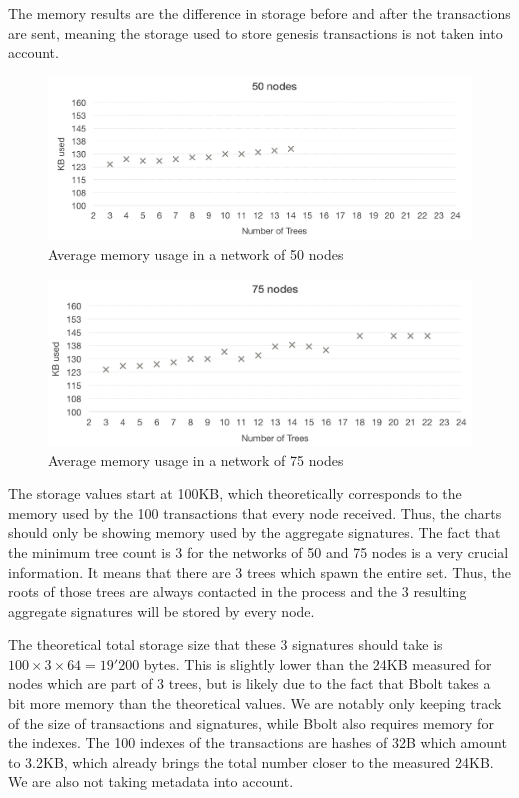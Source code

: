 \documentclass[11pt, a4paper, twoside, openright]{article}
\begin{document}
The memory results are the difference in storage before and after the transactions are sent, meaning the storage used to store genesis transactions is not taken into account.


\begin{figure}[htbp]
 \centering
  \includegraphics[width=\textwidth]{50graph.png}
  \caption{Average memory usage in a network of 50 nodes}
\end{figure}

\begin{figure}[htbp]
 \centering
  \includegraphics[width=\textwidth]{75graph.png}
  \caption{Average memory usage in a network of 75 nodes}
\end{figure}

\newpage
The storage values start at 100KB, which theoretically corresponds to the memory used by the 100 transactions that every node received. Thus, the charts should only be showing memory used by the aggregate signatures. The fact that the minimum tree count is 3 for the networks of 50 and 75 nodes is a very crucial information. It means that there are 3 trees which spawn the entire set. Thus, the roots of those trees are always contacted in the process and the 3 resulting aggregate signatures will be stored by every node.

The theoretical total storage size that these 3 signatures should take is $100 \times 3 \times 64=19'200$ bytes. This is slightly lower than the 24KB measured for nodes which are part of 3 trees, but is likely due to the fact that Bbolt takes a bit more memory than the theoretical values. We are notably only keeping track of the size of transactions and signatures, while Bbolt also requires memory for the indexes. The 100 indexes of the transactions are hashes of 32B which amount to 3.2KB, which already brings the total number closer to the measured 24KB. We are also not taking metadata into account.
\end{document}

